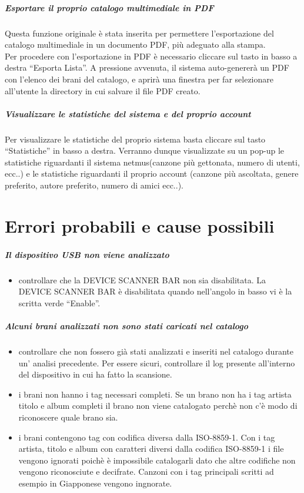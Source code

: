 \subparagraph{Esportare il proprio catalogo multimediale in PDF}

Questa funzione originale \`e stata inserita per permettere l'esportazione del
catalogo multimediale in un documento PDF, pi\`u adeguato alla stampa.\\
Per procedere con l'esportazione in PDF \`e necessario cliccare sul tasto in
basso a destra ``Esporta Lista''. A pressione avvenuta, il sistema
auto-generer\`a un PDF con l'elenco dei brani del catalogo, e aprir\`a una
finestra per far selezionare all'utente la directory in cui salvare il file PDF
creato.

\subparagraph{Visualizzare le statistiche del sistema e del proprio account}

Per visualizzare le statistiche del proprio sistema basta cliccare sul tasto
``Statistiche'' in basso a destra. Verranno dunque visualizzate su un pop-up le
statistiche riguardanti il sistema netmus(canzone pi\`u gettonata, numero di
utenti, ecc..) e le statistiche riguardanti il proprio account (canzone pi\`u
ascoltata, genere preferito, autore preferito, numero di amici ecc..).




\section{Errori probabili e cause possibili}

\subparagraph{Il dispositivo USB non viene analizzato}
\begin{itemize}
  \item controllare che la DEVICE SCANNER BAR non sia disabilitata. La DEVICE
  SCANNER BAR \`e disabilitata quando nell'angolo in basso vi \`e la scritta
  verde ``Enable''.
\end{itemize}

\subparagraph{Alcuni brani analizzati non sono stati caricati nel catalogo}
\begin{itemize}
  \item controllare che non fossero gi\`a stati analizzati e inseriti nel
  catalogo durante un' analisi precedente. Per essere sicuri, controllare il log
  presente all'interno del dispositivo in cui  ha fatto la scansione.
  \item i brani non hanno i tag necessari completi. Se un brano non ha i
  tag artista titolo e album completi il brano non viene catalogato perch\`e non
  c'\`e modo di riconoscere quale brano sia.
  \item i brani contengono tag con codifica diversa dalla ISO-8859-1. Con i tag
  artista, titolo e album con caratteri diversi dalla codifica ISO-8859-1 i file
  vengono ignorati poich\`e \`e impossibile catalogarli dato che altre codifiche
  non vengono riconosciute e decifrate. Canzoni con i tag principali scritti ad
  esempio in Giapponese vengono ingnorate.
\end{itemize}

